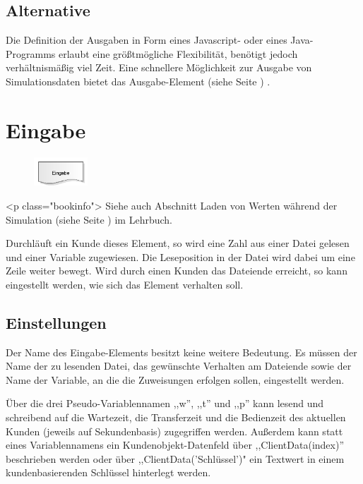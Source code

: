 \subsection*{Alternative}

Die Definition der Ausgaben in Form eines Javascript- oder eines Java-Programms erlaubt eine größtmögliche Flexibilität,
benötigt jedoch verhältnismäßig viel Zeit. Eine schnellere Möglichkeit zur Ausgabe von Simulationsdaten
bietet das Ausgabe-Element (siehe Seite \pageref{ref:ModelElementOutput}) .


\section{Eingabe}
\label{ref:ModelElementInput}

\begin{figure}
\vspace{-22pt}
\includegraphics[width=2cm]{imageModelElementInput.png}
\vspace{-22pt}
\end{figure}

<p class="bookinfo">
Siehe auch Abschnitt Laden von Werten während der Simulation (siehe Seite \pageref{ref:book:9.3.2}) im Lehrbuch.

Durchläuft ein Kunde dieses Element, so wird eine Zahl aus einer Datei gelesen und einer
Variable zugewiesen. Die Leseposition in der Datei wird dabei um eine Zeile weiter bewegt.
Wird durch einen Kunden das Dateiende erreicht, so kann eingestellt werden, wie sich
das Element verhalten soll.

\subsection*{Einstellungen}

Der Name des Eingabe-Elements besitzt keine weitere Bedeutung. Es müssen der Name der zu lesenden
Datei, das gewünschte Verhalten am Dateiende sowie der Name der Variable, an die die Zuweisungen
erfolgen sollen, eingestellt werden.

Über die drei Pseudo-Variablennamen ,,w'', ,,t'' und ,,p'' kann lesend und schreibend auf die Wartezeit, die Transferzeit
und die Bedienzeit des aktuellen Kunden (jeweils auf Sekundenbasis) zugegriffen werden. Außerdem kann statt eines
Variablennamens ein Kundenobjekt-Datenfeld über ,,ClientData(index)'' beschrieben werden oder über ,,ClientData('Schlüssel')"
ein Textwert in einem kundenbasierenden Schlüssel hinterlegt werden.

